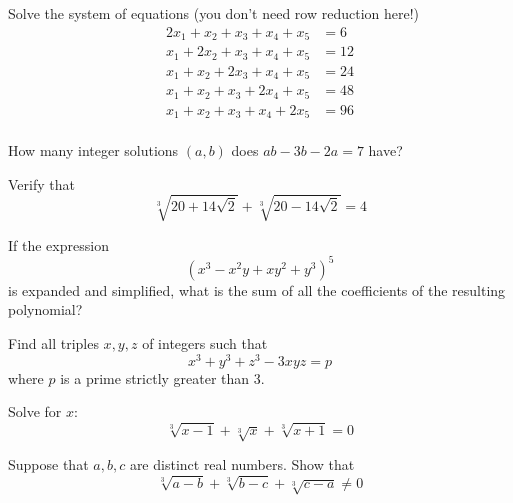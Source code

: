 \documentclass[12pt]{article}
\begin{document}
        \begin{exercise}
            Solve the system of equations (you don't need row reduction here!)
            \begin{align*}
                2x_1+x_2+x_3+x_4+x_5&=6 \\
                x_1+2x_2+x_3+x_4+x_5&=12 \\
                x_1+x_2+2x_3+x_4+x_5&=24 \\
                x_1+x_2+x_3+2x_4+x_5&=48 \\
                x_1+x_2+x_3+x_4+2x_5&=96 \\
            \end{align*}
        \end{exercise}

        \begin{exercise}
            How many integer solutions \((a,b)\) does \(ab-3b-2a=7\) have?
        \end{exercise}

        \begin{exercise}
            Verify that
            \[\sqrt[3]{20+14\sqrt{2}}+\sqrt[3]{20-14\sqrt{2}}=4\]
        \end{exercise}

        \begin{exercise}
            If the expression 
            \[(x^3-x^2y+xy^2+y^3)^5\] 
            is expanded and simplified, what is the sum of all the coefficients of the resulting polynomial?
        \end{exercise}

        \begin{exercise}
            Find all triples $x,y,z$ of integers such that 
            \begin{equation*}
                x^3 + y^3 + z^3 -3xyz = p
            \end{equation*}
            where $p$ is a prime strictly greater than 3.
        \end{exercise}
            
            \begin{exercise}
            Solve for $x$:
            \[\sqrt[3]{x-1} + \sqrt[3]{x}  + \sqrt[3]{x+1} = 0\]
        \end{exercise}
            
        \begin{exercise}
            Suppose that $a,b,c$ are distinct real numbers. Show that 
            \begin{equation*}
                \sqrt[3]{a - b} + \sqrt[3]{b - c}  + \sqrt[3]{c - a} \neq 0
            \end{equation*}
        \end{exercise}
            
\end{document}
